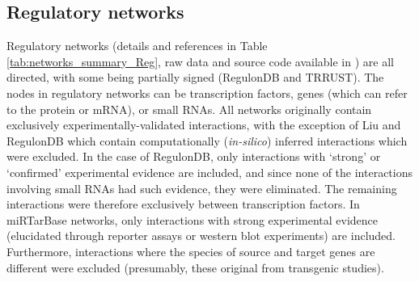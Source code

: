 \documentclass[12pt]{article}	%
\begin{document}
\subsection{Regulatory networks}\label{sup_realnets_reg}
    Regulatory networks (details and references in Table \ref{tab:networks_summary_Reg}, raw data and source code available in  \cite{atiia_case-study_2017}) are all directed, with some being partially signed (RegulonDB and TRRUST). The nodes in regulatory networks can be transcription factors, genes (which can refer to the protein or mRNA), or small RNAs. All networks originally contain exclusively experimentally-validated interactions, with the exception of Liu and RegulonDB which contain computationally (\textit{in-silico}) inferred interactions which were excluded. In the case of RegulonDB, only interactions with  `strong' or `confirmed' experimental evidence are included, and since none of the interactions involving small RNAs had such evidence, they were eliminated. The remaining interactions were therefore exclusively between transcription factors. In miRTarBase networks, only interactions with strong experimental evidence (elucidated through reporter assays or western blot experiments) are included. Furthermore, interactions where the species of source and target genes are different were excluded (presumably, these original from  transgenic studies).
\end{document}
